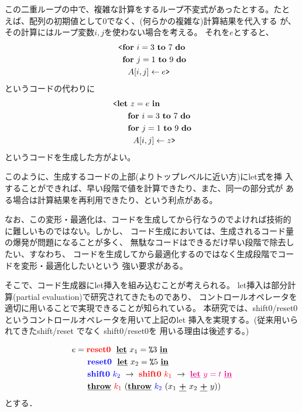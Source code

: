 この二重ループの中で、複雑な計算をするループ不変式があったとする。たと
えば、配列の初期値として$0$でなく、(何らかの複雑な)計算結果を代入する
が、その計算にはループ変数$i,j$を使わない場合を考える。
それを$e$とすると、
\begin{align*}
& \codebegin \forin{i=3}{7} \\
& \phantom{\codebegin} \forin{j=1}{9} \\
& \phantom{\codebegin} ~~\aryset{A}{i,j}{e} \codeend
\end{align*}
というコードの代わりに
\begin{align*}
& \codebegin \Let~z=e~\In \\
& \phantom{\codebegin \Let} \forin{i=3}{7} \\
& \phantom{\codebegin \Let} \forin{j=1}{9} \\
& \phantom{\codebegin \Let} ~~\aryset{A}{i,j}{z} \codeend
\end{align*}
というコードを生成した方がよい。

このように、生成するコードの上部(よりトップレベルに近い方)にlet式を挿
入することができれば、早い段階で値を計算できたり、また、同一の部分式が
ある場合は計算結果を再利用できたり、という利点がある。

なお、この変形・最適化は、コードを生成してから行なうのでよければ技術的
に難しいものではない。しかし、
コード生成においては、生成されるコード量の爆発が問題になることが多く、
無駄なコードはできるだけ早い段階で除去したい、すなわち、
コードを生成してから最適化するのではなく生成段階でコードを変形・最適化したいという
強い要求がある。

そこで、コード生成器にlet挿入を組み込むことが考えられる。
let挿入は部分計算(partial evaluation)で研究されてきたものであり、
コントロールオペレータを適切に用いることで実現できることが知られている。
本研究では、shift0/reset0 というコントロールオペレータを用いて上記のlet
挿入を実現する。(従来用いられてきたshift/reset でなく shift0/reset0を
用いる理由は後述する。)

\begin{align*}
    e &= \textcolor{red}{\textbf{reset0}} ~~\underline{\textbf{let}}~x_1=\texttt{\%}{3}~\underline{\textbf{in}} \\
      &\phantom{=}~~ \textcolor{blue}{\textbf{reset0}} ~~\underline{\textbf{let}}~x_2=\texttt{\%}{5}~\underline{\textbf{in}} \\
      &\phantom{=}~~ \textcolor{blue}{\textbf{shift0}}~\textcolor{blue}{k_2}~\to~ \textcolor{red}{\textbf{shift0}}~\textcolor{red}{k_1}~\to~ \textcolor{magenta}{\underline{\textbf{let}}~y=t~\underline{\textbf{in}}} \\
      &\phantom{=}~~ \underline{\textbf{throw}}~\textcolor{red}{k_1}~(\underline{\textbf{throw}}~\textcolor{blue}{k_2}~(x_1~\underline{\textbf{+}}~x_2~\underline{\textbf{+}}~y))
\end{align*}
とする．

